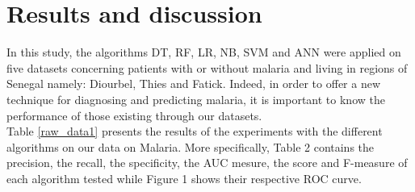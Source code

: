 \section{Results and discussion}
In this study, the algorithms DT, RF, LR, NB, SVM and ANN were applied on five datasets concerning patients with or without malaria and living in regions of Senegal namely: Diourbel, Thies and Fatick. Indeed, in order to offer a new technique for diagnosing and predicting malaria, it is important to know the performance of those existing through our datasets.\\
Table \ref{raw_data1} presents the results of the experiments with the different algorithms on our data on Malaria. More specifically, Table 2 contains the precision, the recall, the specificity, the AUC mesure, the score and F-measure of each algorithm tested while Figure 1 shows their respective ROC curve.  
